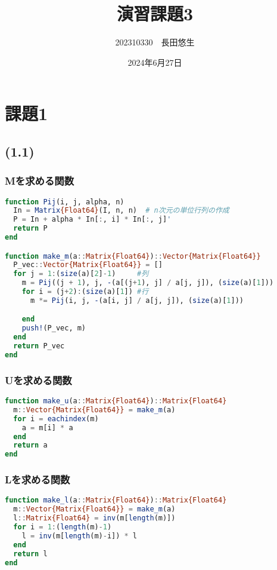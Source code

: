 \documentclass[uplatex, dvipdfmx, a4j,11pt]{jsarticle}
\title{演習課題3}
\author{202310330　長田悠生}
\date{2024年6月27日}
\begin{document}
\section*{課題1}
\subsection*{(1.1)}
\subsubsection*{Mを求める関数}

\begin{lstlisting}[title={(1.1)}, label=code:in, language=Julia]
function Pij(i, j, alpha, n)
  In = Matrix{Float64}(I, n, n)  # n次元の単位行列の作成
  P = In + alpha * In[:, i] * In[:, j]'
  return P
end

function make_m(a::Matrix{Float64})::Vector{Matrix{Float64}}
  P_vec::Vector{Matrix{Float64}} = []
  for j = 1:(size(a)[2]-1)     #列
    m = Pij((j + 1), j, -(a[(j+1), j] / a[j, j]), (size(a)[1]))
    for i = (j+2):(size(a)[1]) #行
      m *= Pij(i, j, -(a[i, j] / a[j, j]), (size(a)[1]))

    end
    push!(P_vec, m)
  end
  return P_vec
end
\end{lstlisting}

\subsubsection*{Uを求める関数}

\begin{lstlisting}[title={(1.1)}, label=code:in, language=Julia]
function make_u(a::Matrix{Float64})::Matrix{Float64}
  m::Vector{Matrix{Float64}} = make_m(a)
  for i = eachindex(m)
    a = m[i] * a
  end
  return a
end
\end{lstlisting}

\subsubsection*{Lを求める関数}

\begin{lstlisting}[title={(1.1)}, label=code:in, language=Julia]
function make_l(a::Matrix{Float64})::Matrix{Float64}
  m::Vector{Matrix{Float64}} = make_m(a)
  l::Matrix{Float64} = inv(m[length(m)])
  for i = 1:(length(m)-1)
    l = inv(m[length(m)-i]) * l
  end
  return l
end
\end{lstlisting}
\end{document}
